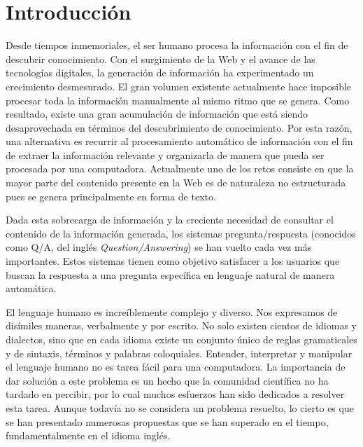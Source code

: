 \chapter*{Introducción}\label{chapter:introduction}

Desde tiempos inmemoriales, el ser humano procesa la información con el fin de descubrir conocimiento. Con el surgimiento de la Web y el avance de las tecnologías digitales, la generación de información ha experimentado un crecimiento desmesurado. El gran volumen existente actualmente hace imposible procesar toda la información manualmente al mismo ritmo que se genera. Como resultado, existe una gran acumulación de información que está siendo desaprovechada en términos del descubrimiento de  conocimiento. Por esta razón, una alternativa es recurrir al procesamiento automático de información con el fin de extraer la información relevante y organizarla de manera que pueda ser procesada por una computadora. Actualmente uno de los retos consiste en que la mayor parte del contenido presente en la Web es de naturaleza no estructurada pues se genera principalmente en forma de texto.

Dada esta sobrecarga de información y la creciente necesidad de consultar el contenido de la información generada, los sistemas pregunta/respuesta (conocidos como Q/A, del inglés \textit{Question/Answering}) se han vuelto cada vez más importantes. Estos sistemas tienen como objetivo satisfacer a los usuarios que buscan la respuesta a una pregunta específica en lenguaje natural de manera automática. 

El lenguaje humano es increíblemente complejo y diverso. Nos expresamos de disímiles maneras, verbalmente y por escrito. No solo existen cientos de idiomas y dialectos, sino que en cada idioma existe un conjunto único de reglas gramaticales y de sintaxis, términos y palabras coloquiales. Entender, interpretar y manipular el lenguaje humano no es tarea fácil para una computadora. La importancia de dar solución a este problema es un hecho que la comunidad científica no ha tardado en percibir, por lo cual muchos esfuerzos han sido dedicados a resolver esta tarea. Aunque todavía no se considera un problema resuelto, lo cierto es que se han presentado numerosas propuestas que se han superado en el tiempo, fundamentalmente en el idioma inglés. 

